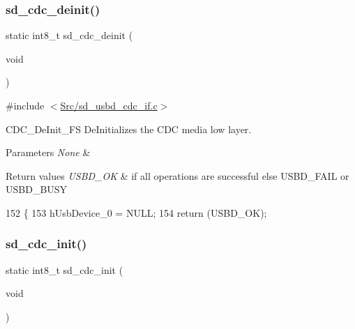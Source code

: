 \subsubsection{\texorpdfstring{sd\+\_\+cdc\+\_\+deinit()}{sd\_cdc\_deinit()}}
{\footnotesize\ttfamily static int8\+\_\+t sd\+\_\+cdc\+\_\+deinit (\begin{DoxyParamCaption}\item[{void}]{ }\end{DoxyParamCaption})\hspace{0.3cm}{\ttfamily [static]}}



{\ttfamily \#include $<$\mbox{\hyperlink{sd__usbd__cdc__if_8c}{Src/sd\+\_\+usbd\+\_\+cdc\+\_\+if.\+c}}$>$}



C\+D\+C\+\_\+\+De\+Init\+\_\+\+FS De\+Initializes the C\+DC media low layer. 


\begin{DoxyParams}{Parameters}
{\em None} & \\
\hline
\end{DoxyParams}

\begin{DoxyRetVals}{Return values}
{\em U\+S\+B\+D\+\_\+\+OK} & if all operations are successful else U\+S\+B\+D\+\_\+\+F\+A\+IL or U\+S\+B\+D\+\_\+\+B\+U\+SY \\
\hline
\end{DoxyRetVals}

\begin{DoxyCode}
152 \{
153     hUsbDevice\_0 = NULL;
154     \textcolor{keywordflow}{return} (USBD\_OK);
\end{DoxyCode}
\mbox{\label{group___s_d___u_s_b___c_d_c___i_f___functions_ga9acc365b136914ed8a39593ee02d0260}} 
\subsubsection{\texorpdfstring{sd\+\_\+cdc\+\_\+init()}{sd\_cdc\_init()}}
{\footnotesize\ttfamily static int8\+\_\+t sd\+\_\+cdc\+\_\+init (\begin{DoxyParamCaption}\item[{void}]{ }\end{DoxyParamCaption})\hspace{0.3cm}{\ttfamily [static]}}



